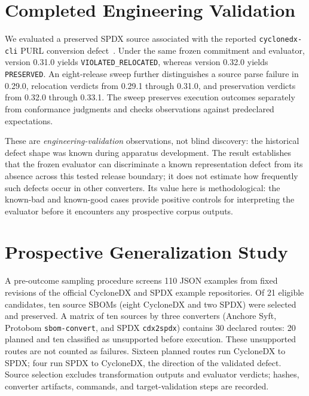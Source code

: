 \documentclass[conference,10pt]{IEEEtran}
\begin{document}
\section{Completed Engineering Validation}

We evaluated a preserved SPDX source associated with the reported
\texttt{cyclonedx-cli} PURL conversion defect~\cite{issue424}.
Under the same frozen commitment and evaluator, version 0.31.0 yields
\texttt{VIOLATED\_RELOCATED}, whereas version 0.32.0 yields
\texttt{PRESERVED}.
An eight-release sweep further distinguishes a source
parse failure in 0.29.0, relocation verdicts from 0.29.1 through 0.31.0,
and preservation verdicts from 0.32.0 through 0.33.1.
The sweep preserves execution outcomes separately from conformance judgments and
checks observations against predeclared expectations.

These are \emph{engineering-validation} observations, not blind discovery:
the historical defect shape was known during apparatus development.
The result establishes that the frozen evaluator can discriminate a known
representation defect from its absence across this tested release boundary;
it does not estimate how frequently such defects occur in other converters.
Its value here is methodological:
the known-bad and known-good cases provide positive controls
for interpreting the evaluator before it encounters any prospective corpus outputs.

\balance
\section{Prospective Generalization Study}

A pre-outcome sampling procedure screens 110 JSON examples from fixed
revisions of the official CycloneDX and SPDX example repositories.
Of 21 eligible candidates,
ten source SBOMs (eight CycloneDX and two SPDX) were selected and preserved.
A matrix of ten sources by three converters
(Anchore Syft, Protobom \texttt{sbom-convert}, and SPDX \texttt{cdx2spdx})
contains 30 declared routes:
20 planned and ten classified as unsupported before execution.
These unsupported routes are not counted as failures.
Sixteen planned routes run CycloneDX to SPDX;
four run SPDX to CycloneDX, the direction of the validated defect.
Source selection excludes transformation outputs and evaluator verdicts;
hashes, converter artifacts, commands, and target-validation steps are recorded.
\end{document}
